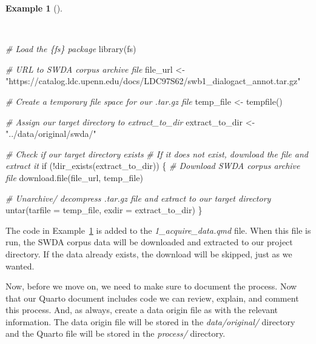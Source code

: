 \documentclass[
  letterpaper,
  krantz1]{latex/krantz-mod}
\newenvironment{Shaded}{\begin{snugshade}}{\end{snugshade}}
\newcommand{\AttributeTok}[1]{\textcolor[rgb]{0.00,0.00,0.00}{#1}}
\newcommand{\CommentTok}[1]{\textcolor[rgb]{0.00,0.00,0.00}{\textit{#1}}}
\newcommand{\ControlFlowTok}[1]{\textcolor[rgb]{0.00,0.00,0.00}{#1}}
\newcommand{\FunctionTok}[1]{\textcolor[rgb]{0.00,0.00,0.00}{#1}}
\newcommand{\NormalTok}[1]{\textcolor[rgb]{0.00,0.00,0.00}{#1}}
\newcommand{\OtherTok}[1]{\textcolor[rgb]{0.00,0.00,0.00}{#1}}
\newcommand{\SpecialCharTok}[1]{\textcolor[rgb]{0.00,0.00,0.00}{#1}}
\newcommand{\StringTok}[1]{\textcolor[rgb]{0.00,0.00,0.00}{#1}}
\theoremstyle{definition}
\newtheorem{example}{Example}[chapter]
\theoremstyle{definition}
\theoremstyle{remark}
\begin{document}
\begin{example}[]\protect\hypertarget{exm-acquire-swda-if-dir-exists}{}\label{exm-acquire-swda-if-dir-exists}

~

\begin{Shaded}
\begin{Highlighting}[numbers=left,,]
\CommentTok{\# Load the \{fs\} package}
\FunctionTok{library}\NormalTok{(fs)}

\CommentTok{\# URL to SWDA corpus archive file}
\NormalTok{file\_url }\OtherTok{\textless{}{-}}
  \StringTok{"https://catalog.ldc.upenn.edu/docs/LDC97S62/swb1\_dialogact\_annot.tar.gz"}

\CommentTok{\# Create a temporary file space for our .tar.gz file}
\NormalTok{temp\_file }\OtherTok{\textless{}{-}} \FunctionTok{tempfile}\NormalTok{()}

\CommentTok{\# Assign our target directory to \textasciigrave{}extract\_to\_dir\textasciigrave{}}
\NormalTok{extract\_to\_dir }\OtherTok{\textless{}{-}} \StringTok{"../data/original/swda/"}

\CommentTok{\# Check if our target directory exists}
\CommentTok{\# If it does not exist, download the file and extract it}
\ControlFlowTok{if}\NormalTok{ (}\SpecialCharTok{!}\FunctionTok{dir\_exists}\NormalTok{(extract\_to\_dir)) \{}
  \CommentTok{\# Download SWDA corpus archive file}
  \FunctionTok{download.file}\NormalTok{(file\_url, temp\_file)}

  \CommentTok{\# Unarchive/ decompress .tar.gz file and extract to our target directory}
  \FunctionTok{untar}\NormalTok{(}\AttributeTok{tarfile =}\NormalTok{ temp\_file, }\AttributeTok{exdir =}\NormalTok{ extract\_to\_dir)}
\NormalTok{\}}
\end{Highlighting}
\end{Shaded}

\end{example}

The code in Example~\ref{exm-acquire-swda-if-dir-exists} is added to the
\emph{1\_acquire\_data.qmd} file. When this file is run, the SWDA corpus
data will be downloaded and extracted to our project directory. If the
data already exists, the download will be skipped, just as we wanted.

Now, before we move on, we need to make sure to document the process.
Now that our Quarto document includes code we can review, explain, and
comment this process. And, as always, create a data origin file as with
the relevant information. The data origin file will be stored in the
\emph{data/original/} directory and the Quarto file will be stored in
the \emph{process/} directory.
\end{document}
